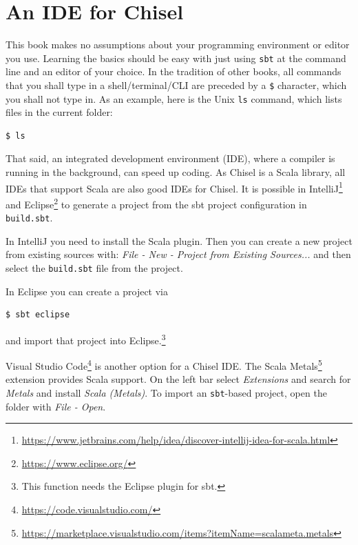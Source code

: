 \documentclass[%
    10pt,
    headinclude, footexclude,
    openright, %
    notitlepage,
    cleardoubleempty,
    headsepline,
    pointlessnumbers,
    bibtotoc, idxtotoc,
    ]{scrbook}
\newcommand{\code}[1]{{\small{\texttt{#1}}}}
\newcommand{\myref}[2]{\href{#1}{#2}}
\renewcommand{\myref}[2]{{#2}{\footnote{\url{#1}}}}
\begin{document}
\section{An IDE for Chisel}

This book makes no assumptions about your programming environment or editor you use.
Learning the basics should be easy with just using \code{sbt} at the command line
and an editor of your choice. In the tradition of other books, all commands that you
shall type in a shell/terminal/CLI are preceded by a \code{\$} character, which you
shall not type in. As an example, here is the Unix \code{ls} command, which lists files in
the current folder:

\begin{verbatim}
$ ls
\end{verbatim}

That said, an integrated development environment (IDE), where a compiler is running in
the background, can speed up coding. As Chisel is a Scala library, all IDEs
that support Scala are also good IDEs for Chisel.
It is possible in
\myref{https://www.jetbrains.com/help/idea/discover-intellij-idea-for-scala.html}{IntelliJ} and
 \myref{https://www.eclipse.org/}{Eclipse}
to generate a project from the sbt project configuration in \code{build.sbt}.

In IntelliJ you need to install the Scala plugin. Then you can create a new project from existing sources with:
\emph{File - New - Project from Existing Sources...} and then select the \code{build.sbt}
file from the project.

In Eclipse you can create a project via
\begin{verbatim}
$ sbt eclipse
\end{verbatim}
and import that project into Eclipse.\footnote{This function needs the Eclipse plugin for sbt.}

\myref{https://code.visualstudio.com/}{Visual Studio Code} is another option for a Chisel IDE.
The \myref{https://marketplace.visualstudio.com/items?itemName=scalameta.metals}{Scala Metals}
extension provides Scala support.
On the left bar select \emph{Extensions} and search for \emph{Metals} and install \emph{Scala (Metals)}.
To import an \code{sbt}-based project, open the folder with \emph{File - Open}.

\end{document}
